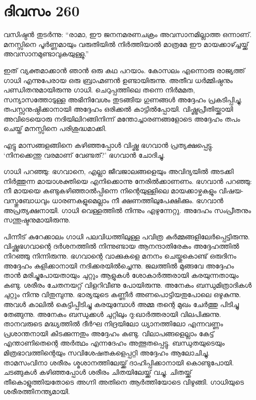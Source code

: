 \section{ദിവസം 260}


വസിഷ്ഠന്‍ തുടര്‍ന്നു: “രാമാ, ഈ ജനനമരണചക്രം അവസാനമില്ലാത്ത ഒന്നാണ്. മനസ്സിനെ പൂര്‍ണ്ണമായും വരുതിയില്‍ നിര്‍ത്തിയാല്‍ മാത്രമേ ഈ മായക്കാഴ്ച്ചയ്ക്ക് അവസാനമുണ്ടാവുകയുള്ളു.” 

ഇത് വ്യക്തമാക്കാന്‍ ഞാന്‍ ഒരു കഥ പറയാം. കോസലം എന്നൊരു രാജ്യത്ത് ഗാധി എന്നുപേരായ ഒരു ബ്രാഹ്മണന്‍ ഉണ്ടായിരുന്നു. അതീവ ധര്‍മ്മിഷ്ഠനും പണ്ഡിതനുമായിരുന്നു ഗാധി. ചെറുപ്പത്തിലെ തന്നെ നിര്‍മമത, സന്യാസത്തോടുള്ള അഭിനിവേശം തുടങ്ങിയ ഗുണങ്ങള്‍ അദ്ദേഹം പ്രകടിപ്പിച്ചു. തപസ്സനുഷ്ഠിക്കാനായി അദ്ദേഹം ഒരിക്കല്‍ കാട്ടില്‍പ്പോയി. വിഷ്ണുപ്രീതിയ്ക്കായി അവിടെയൊരു നദിയിലിറങ്ങിനിന്ന് മന്തോച്ചാരണങ്ങളോടെ അദ്ദേഹം തപം ചെയ്ത് മനസ്സിനെ പരിശുദ്ധമാക്കി.

എട്ടു മാസങ്ങളങ്ങിനെ കഴിഞ്ഞപ്പോള്‍ വിഷ്ണു ഭഗവാന്‍ പ്രത്യക്ഷപ്പെട്ടു. ‘നിനക്കെന്തു വരമാണ് വേണ്ടത്?’ ഭഗവാന്‍ ചോദിച്ചു.

ഗാധി പറഞ്ഞു: ഭഗവാനെ, എല്ലാ ജീവജാലങ്ങളെയും അവിദ്യയില്‍ അടക്കി നിര്‍ത്തുന്ന മായാശക്തിയെ എനിക്കൊന്നു നേരില്‍ക്കാണണം. ഭഗവാന്‍ പറഞ്ഞു: നീ മായയെ കണ്ടുകഴിഞ്ഞാല്‍പ്പിന്നെ നിന്റെയുള്ളിലെ മായക്കാഴ്ചകളും വിഷയ-വസ്തുബോധവും ധാരണകളുമെല്ലാം നീ ക്ഷണത്തിലുപേക്ഷിക്കും. ഭഗവാന്‍ അപ്രത്യക്ഷനായി. ഗാധി വെള്ളത്തില്‍ നിന്നും എഴുന്നേറ്റു. അദേഹം സംപ്രീതനും സന്തുഷ്ടനുമായിരുന്നു.

പിന്നീട് കുറേക്കാലം ഗാധി പലവിധത്തിലുള്ള പവിത്ര കര്‍മ്മങ്ങളിലേര്‍പ്പെട്ടിരുന്നു. വിഷ്ണുഭഗവാന്റെ ദര്‍ശനത്തില്‍ നിന്നുണ്ടായ ആനന്ദാതിരേകം അദ്ദേഹത്തില്‍ നിറഞ്ഞു നിന്നിരുന്നു. ഭഗവാന്റെ വാക്കുകളെ മനനം ചെയ്തുകൊണ്ട് ഒരുദിനം അദ്ദേഹം കുളിക്കാനായി നദിക്കരയില്‍ച്ചെന്നു. ജലത്തില്‍ മുങ്ങവേ അദ്ദേഹം താന്‍ മരിച്ചുപോയതായും ചുറ്റും ആളുകള്‍ ശോകാര്‍ത്തരായി കരയുന്നതായും കണ്ടു. ശരീരം ചേതനയറ്റ് വിളറിവീണു പോയിരുന്നു. അനേകം ബന്ധുമിത്രാദികള്‍ ചുറ്റും നിന്നു വിതുമ്പുന്നു. ഭാര്യയുടെ കണ്ണീര്‍ അണപൊട്ടിയതുപോലെ ഒഴുകുന്നു. അവള്‍ കാലില്‍ കെട്ടിപ്പിടിച്ചു കരയുമ്പോള്‍ അമ്മ തന്റെ മുഖം ചേര്‍ത്തു പിടിച്ചു തേങ്ങുന്നു. അനേകം ബന്ധുക്കള്‍ ചുറ്റിലും ദു:ഖാര്‍ത്തരായി വിലപിക്കുന്നു. താനവരുടെ മദ്ധ്യത്തില്‍ ദീര്‍ഘ നിദ്രയിലോ ധ്യാനത്തിലോ എന്നവണ്ണം പ്രശാന്തനായി കിടക്കുന്നതും അദ്ദേഹം കണ്ടു. വിലാപങ്ങളെല്ലാം കേട്ട് എന്താണിതെന്റെ അര്‍ത്ഥം എന്നദേഹം അത്ഭുതപ്പെട്ടു. ബന്ധുതയുടെയും മിത്രഭാവത്തിന്റെയും സവിശേഷതകളെപ്പറ്റി അദ്ദേഹം ആലോചിച്ചു. താമസംവിനാ ശരീരം ശ്മശാനത്തിലേയ്ക്ക് ദാഹിപ്പിക്കാനായി കൊണ്ടുപോയി. ചടങ്ങുകള്‍ കഴിഞ്ഞപ്പോള്‍ ശരീരം ചിതയിലേയ്ക്ക് വച്ചു. ചിതയ്ക്ക് തീകൊളുത്തിയതോടെ അഗ്നി അതിനെ ആര്‍ത്തിയോടെ വിഴുങ്ങി. ഗാധിയുടെ ശരീരത്തിനന്ത്യമായി.